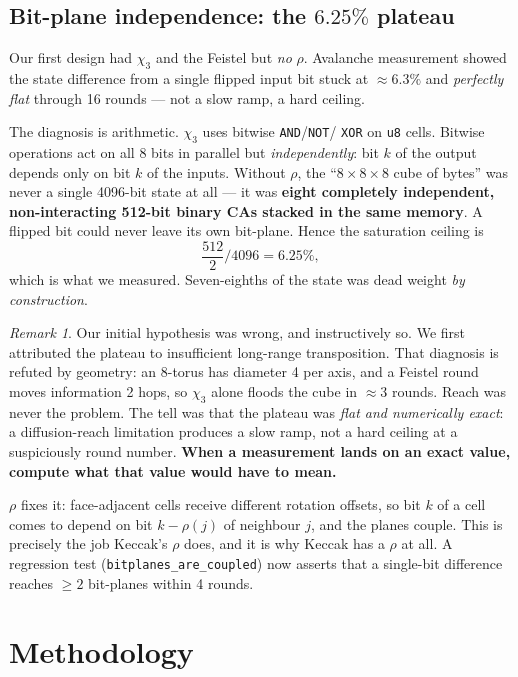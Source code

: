 \documentclass[11pt,a4paper]{article}
\theoremstyle{plain}
\theoremstyle{definition}
\theoremstyle{remark}
\newtheorem*{remark}{Remark}
\begin{document}
\subsection{Bit-plane independence: the $6.25\%$ plateau}
\label{sec:planebug}

Our first design had $\chi_3$ and the Feistel but \emph{no} $\rho$. Avalanche
measurement showed the state difference from a single flipped input bit stuck at
$\approx 6.3\%$ and \emph{perfectly flat} through 16 rounds --- not a slow ramp, a
hard ceiling.

The diagnosis is arithmetic. $\chi_3$ uses bitwise \texttt{AND}/\texttt{NOT}/%
\texttt{XOR} on \texttt{u8} cells. Bitwise operations act on all 8 bits in parallel
but \emph{independently}: bit $k$ of the output depends only on bit $k$ of the inputs.
Without $\rho$, the ``$8\times8\times8$ cube of bytes'' was never a single 4096-bit
state at all --- it was \textbf{eight completely independent, non-interacting 512-bit
binary CAs stacked in the same memory}. A flipped bit could never leave its own
bit-plane. Hence the saturation ceiling is
\[
  \frac{512}{2} \Big/ 4096 = 6.25\%,
\]
which is what we measured. Seven-eighths of the state was dead weight \emph{by
construction}.

\begin{remark}
Our initial hypothesis was wrong, and instructively so. We first attributed the
plateau to insufficient long-range transposition. That diagnosis is refuted by
geometry: an 8-torus has diameter 4 per axis, and a Feistel round moves information 2
hops, so $\chi_3$ alone floods the cube in $\approx 3$ rounds. Reach was never the
problem. The tell was that the plateau was \emph{flat and numerically exact}: a
diffusion-reach limitation produces a slow ramp, not a hard ceiling at a suspiciously
round number. \textbf{When a measurement lands on an exact value, compute what that
value would have to mean.}
\end{remark}

$\rho$ fixes it: face-adjacent cells receive different rotation offsets, so bit $k$ of
a cell comes to depend on bit $k - \rho(j)$ of neighbour $j$, and the planes couple.
This is precisely the job Keccak's $\rho$ does, and it is why Keccak has a $\rho$ at
all. A regression test (\texttt{bitplanes\_are\_coupled}) now asserts that a
single-bit difference reaches $\ge 2$ bit-planes within 4 rounds.

\section{Methodology}
\label{sec:method}
\end{document}
